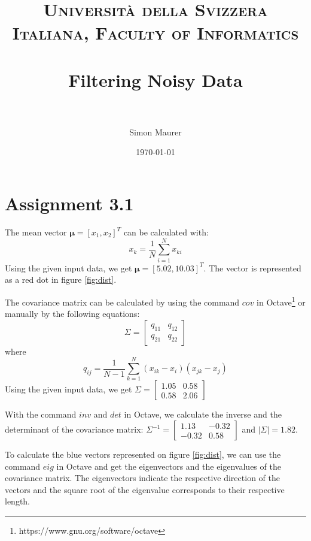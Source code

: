 \documentclass[paper=a4, fontsize=11pt]{scrartcl} %
\title{	
\normalfont \normalsize 
\textsc{Università della Svizzera Italiana, Faculty of Informatics} \\ [25pt] %
\horrule{0.5pt} \\[0.4cm] %
\huge Filtering Noisy Data \\ %
\horrule{2pt} \\[0.5cm] %
}
\author{Simon Maurer} %
\date{\normalsize\today} %
\begin{document}
\maketitle %


\section{Assignment 3.1}

The mean vector $ \boldsymbol{\mu} = [x_1, x_2]^T $ can be calculated with:
\begin{equation}
    x_k = \frac{1}{N}\sum\limits_{i=1}^{N} x_{ki}
\end{equation}
Using the given input data, we get $ \boldsymbol{\mu} = [5.02, 10.03]^T $. The
vector is represented as a red dot in figure \ref{fig:dist}.

The covariance matrix can be calculated by using the command $ cov $ in
Octave\footnote{https://www.gnu.org/software/octave} or manually  by the
following equations:
\begin{equation}
    \Sigma = \begin{bmatrix}
        q_{11} & q_{12} \\
        q_{21} & q_{22}
    \end{bmatrix}
\end{equation}
where
\begin{equation}
    q_{ij} = \frac{1}{N-1} \sum\limits_{k=1}^{N} (x_{ik} - x_i)(x_{jk} - x_j)
\end{equation}
Using the given input data, we get $ \Sigma = 
\begin{bmatrix}
    1.05 & 0.58 \\
    0.58 & 2.06
\end{bmatrix} $

With the command $ inv $ and $ det $ in Octave, we calculate the inverse and
the determinant of the covariance matrix: $ \Sigma^{-1} =
\begin{bmatrix}
    1.13 & -0.32 \\
    -0.32 & 0.58
\end{bmatrix} $ and $ |\Sigma| = 1.82 $.

To calculate the blue vectors represented on figure \ref{fig:dist}, we can use
the command $ eig $ in Octave and get the eigenvectors and the eigenvalues of
the covariance matrix. The eigenvectors indicate the respective direction of
the vectors and the square root of the eigenvalue corresponds to their
respective length.
\end{document}
